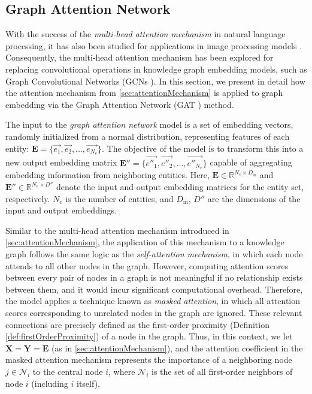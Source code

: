 

\subsection{Graph Attention Network}
\label{sec:GAT}

With the success of the \textit{multi-head attention mechanism} in natural language processing, it has also been studied for applications in image processing models \cite{ramachandran2019stand}. Consequently, the multi-head attention mechanism has been explored for replacing convolutional operations in knowledge graph embedding models, such as Graph Convolutional Networks (GCNs \cite{kipf2016semi}). In this section, we present in detail how the attention mechanism from \ref{sec:attentionMechanism} is applied to graph embedding via the Graph Attention Network (GAT \cite{velivckovic2017graph}) method.

The input to the \textit{graph attention network} model is a set of embedding vectors, randomly initialized from a normal distribution, representing features of each entity: $\mathbf{E} = \Big\{\overrightarrow{e_1}, \overrightarrow{e_2}, ...,  \overrightarrow{e_{N_e}}\Big\}$. The objective of the model is to transform this into a new output embedding matrix $\mathbf{E}'' = \Big\{\overrightarrow{e''_1}, \overrightarrow{e''_2}, ...,  \overrightarrow{e''_{N_e}}\Big\}$ capable of aggregating embedding information from neighboring entities. Here, $\mathbf{E} \in \mathbb{R}^{N_e \times D_{\text{in}}}$ and $\mathbf{E}'' \in \mathbb{R}^{N_e \times D''}$ denote the input and output embedding matrices for the entity set, respectively. $N_e$ is the number of entities, and $D_{\text{in}}$, $D''$ are the dimensions of the input and output embeddings.

Similar to the multi-head attention mechanism introduced in \ref{sec:attentionMechanism}, the application of this mechanism to a knowledge graph follows the same logic as the \textit{self-attention mechanism}, in which each node attends to all other nodes in the graph. However, computing attention scores between every pair of nodes in a graph is not meaningful if no relationship exists between them, and it would incur significant computational overhead. Therefore, the model applies a technique known as \textit{masked attention}, in which all attention scores corresponding to unrelated nodes in the graph are ignored. These relevant connections are precisely defined as the first-order proximity (Definition \ref{def:firstOrderProximity}) of a node in the graph. Thus, in this context, we let $\mathbf{X} = \mathbf{Y} = \mathbf{E}$ (as in \ref{sec:attentionMechanism}), and the attention coefficient in the masked attention mechanism represents the importance of a neighboring node $j \in \mathcal{N}_{i}$ to the central node $i$, where $\mathcal{N}_{i}$ is the set of all first-order neighbors of node $i$ (including $i$ itself).




